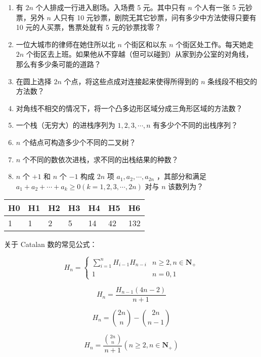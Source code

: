 \begin{enumerate}
\item 有 $2n$ 个人排成一行进入剧场。入场费 5 元。其中只有 $n$ 个人有一张 5 元钞票，另外 $n$ 人只有 10 元钞票，剧院无其它钞票，问有多少中方法使得只要有 10 元的人买票，售票处就有 5 元的钞票找零？
\item 一位大城市的律师在她住所以北 $n$ 个街区和以东 $n$ 个街区处工作。每天她走 $2n$ 个街区去上班。如果他从不穿越（但可以碰到）从家到办公室的对角线，那么有多少条可能的道路？
\item 在圆上选择 $2n$ 个点，将这些点成对连接起来使得所得到的 $n$ 条线段不相交的方法数？
\item 对角线不相交的情况下，将一个凸多边形区域分成三角形区域的方法数？
\item 一个栈（无穷大）的进栈序列为 $1,2,3, \cdots ,n$ 有多少个不同的出栈序列？
\item $n$ 个结点可构造多少个不同的二叉树？
\item $n$ 个不同的数依次进栈，求不同的出栈结果的种数？
\item $n$ 个 $+1$ 和 $n$ 个 $-1$ 构成 $2n$ 项 $a_1,a_2, \cdots ,a_{2n}$ ，其部分和满足 $a_1+a_2+ \cdots +a_k \geq 0(k=1,2,3, \cdots ,2n)$ 对与 $n$ 该数列为？
\end{enumerate}

\begin{table}[ht]
\begin{tabular}{|l|l|l|l|l|l|l|}
\hline
H0 & H1 & H2 & H3 & H4 & H5 & H6  \\ \hline
1  & 1  & 2  & 5  & 14 & 42 & 132 \\ \hline
\end{tabular}
\end{table}


关于 Catalan 数的常见公式：

$$
H_n = \begin{cases}
    \sum_{i=1}^{n} H_{i-1} H_{n-i} & n \geq 2, n \in \mathbf{N_{+}}\\
    1 & n = 0, 1
\end{cases}
$$

$$
H_n = \frac{H_{n-1} (4n-2)}{n+1}
$$

$$
H_n = \binom{2n}{n} - \binom{2n}{n-1}
$$

$$
H_n = \frac{\binom{2n}{n}}{n+1}(n \geq 2, n \in \mathbf{N_{+}})
$$
